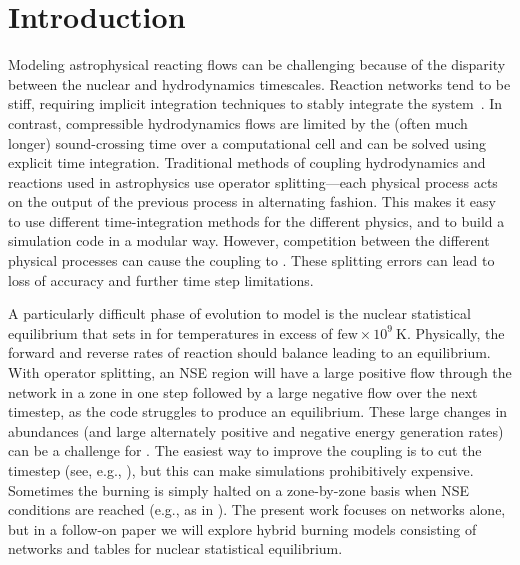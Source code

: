 \documentclass[linenumbers,trackchanges]{aastex631}
\begin{document}

\section{Introduction}\label{Sec:Introduction}

Modeling astrophysical reacting flows can be challenging because of
the disparity between the nuclear and hydrodynamics timescales.
Reaction networks tend to be stiff, requiring implicit integration
techniques to stably integrate the system~\citep{BYRNE19871}.  In contrast, compressible
hydrodynamics flows are limited by the (often much longer)
sound-crossing time over a computational cell and can be solved using
explicit time integration. Traditional methods of coupling
hydrodynamics and reactions used in astrophysics use operator
splitting---each physical process acts on the output of the previous
process in alternating fashion.  This makes it easy to use different
time-integration methods for the different physics, and to build a
simulation code in a modular way.  However, competition between the
different physical processes can cause the coupling to .
These splitting errors can lead to loss of accuracy and further time
step limitations.

A particularly difficult phase of evolution to model is the nuclear
statistical equilibrium that sets in for temperatures in excess of
$\mbox{few} \times 10^9~\mathrm{K}$.  Physically, the forward and
reverse rates of reaction should balance leading to an equilibrium.
With operator splitting, an NSE region will have a large positive flow
through the network in a zone in one step followed by a large negative
flow over the next timestep, as the code struggles to produce an
equilibrium. 
These large changes in abundances (and large alternately positive and negative energy generation rates) can be a challenge for
.  The easiest way to improve the coupling is to cut the
timestep (see, e.g., \citealt{couch:2015,rivas:2022}), but this can make simulations
prohibitively expensive.  Sometimes the burning is simply halted on a
zone-by-zone basis when NSE conditions are reached (e.g., as in
\citealt{hedet}).  The
present work focuses on networks alone, but in a follow-on paper we
will explore hybrid burning models consisting of networks and tables for
nuclear statistical equilibrium.
\end{document}
